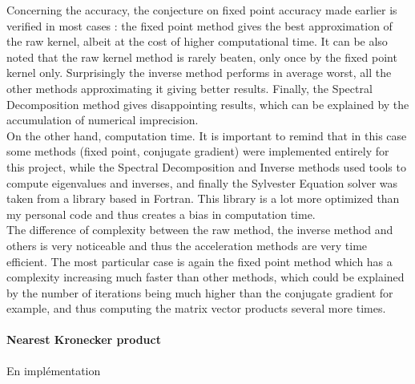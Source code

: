 \documentclass{article}
\theoremstyle{definition}
\begin{document}
Concerning the accuracy, the conjecture on fixed point accuracy made earlier is verified in most cases : the fixed point method gives the best approximation of the raw kernel, albeit at the cost of higher computational time. It can be also noted that the raw kernel method is rarely beaten, only once by the fixed point kernel only. Surprisingly the inverse method performs in average worst, all the other methods approximating it giving better results. Finally, the Spectral Decomposition method gives disappointing results, which can be explained by the accumulation of numerical imprecision.\\
On the other hand, computation time. It is important to remind that in this case some methods (fixed point, conjugate gradient) were implemented entirely for this project, while the Spectral Decomposition and Inverse methods used tools to compute eigenvalues and inverses, and finally the Sylvester Equation solver was taken from a library based in Fortran. This library is a lot more optimized than my personal code and thus creates a bias in computation time.\\
The difference of complexity between the raw method, the inverse method and others is very noticeable and thus the acceleration methods are very time efficient. The most particular case is again the fixed point method which has a complexity increasing much faster than other methods, which could be explained by the number of iterations being much higher than the conjugate gradient for example, and thus computing the matrix vector products several more times.
\paragraph{Nearest Kronecker product}
En implémentation
\end{document}
